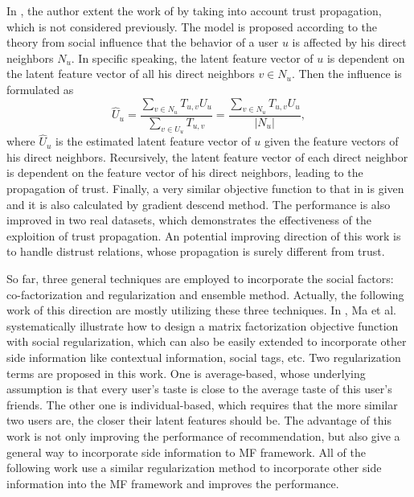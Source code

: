 \documentclass[10pt,onecolumn,conference]{IEEEtran}
\begin{document}
In \cite{jamali2010matrix}, the author extent the work of \cite{ma2009llearningEnsembel} by taking into account trust propagation, which is not considered previously. The model is proposed according to the theory from social influence that the behavior of a user $u$ is affected by his direct neighbors $N_u$. In specific speaking, the latent feature vector of $u$ is dependent on the latent feature vector of all his direct neighbors $v \in N_u$. Then the influence is formulated as 
\begin{equation}
\widehat{U}_u = \frac{\sum_{v \in N_u} T_{u,v}U_u}{\sum_{v \in U_u}T_{u,v}} = \frac{\sum_{v \in N_u} T_{u,v}U_u}{|N_u|},
\end{equation}
where $\widehat{U}_u$ is the estimated latent feature vector of $u$ given the feature vectors of his direct neighbors. Recursively, the latent feature vector of each direct neighbor is dependent on the feature vector of his direct neighbors, leading to the propagation of trust. Finally, a very similar objective function to that in \cite{ma2009learningTrust} is given and it is also calculated by gradient descend method. The performance is also improved in two real datasets, which demonstrates the effectiveness of the exploition of trust propagation. An potential improving direction of this work is to handle distrust relations, whose propagation is surely different from trust.

So far, three general techniques are employed to incorporate the social factors: co-factorization \cite{ma2008sorec} and regularization \cite{ma2009learningTrust}\cite{jamali2010matrix} and ensemble method\cite{ma2009llearningEnsembel}. Actually, the following work of this direction are mostly utilizing these three techniques. In \cite{ma2011recommender}, Ma et al. systematically illustrate how to design a matrix factorization objective function with social regularization, which can also be easily extended to incorporate other side information like contextual information, social tags, etc. Two regularization terms are proposed in this work. One is average-based, whose underlying assumption is that every user's taste is close to the average taste of this user's friends. The other one is individual-based, which requires that the more similar two users are, the closer their latent features should be. The advantage of this work is not only improving the performance of recommendation, but also give a general way to incorporate side information to MF framework. All of the following work \cite{Forsati:2015:PER:2792838.2800198} \cite{li2015overlapping} \cite{yang2013social} use a similar regularization method to incorporate other side information into the MF framework and improves the performance.
\end{document}
